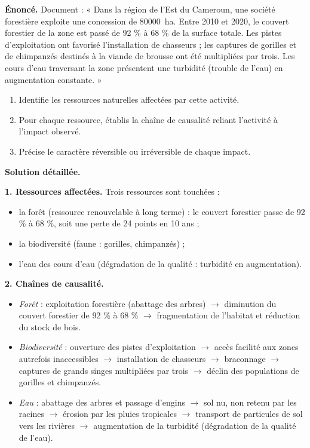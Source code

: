 \documentclass[11pt]{article}
\newcommand{\cle}[1]{{\popxbold\color{popdark}#1}}
\begin{document}
\begin{exoresolu}
\textbf{Énoncé.} Document : « Dans la région de l'Est du Cameroun, une société forestière exploite une concession de \SI{80000}{ha}. Entre 2010 et 2020, le couvert forestier de la zone est passé de 92 \% à 68 \% de la surface totale. Les pistes d'exploitation ont favorisé l'installation de chasseurs ; les captures de gorilles et de chimpanzés destinés à la viande de brousse ont été multipliées par trois. Les cours d'eau traversant la zone présentent une turbidité (trouble de l'eau) en augmentation constante. »
\begin{enumerate}
\item Identifie les ressources naturelles affectées par cette activité.
\item Pour chaque ressource, établis la chaîne de causalité reliant l'activité à l'impact observé.
\item Précise le caractère réversible ou irréversible de chaque impact.
\end{enumerate}
\tcblower
\textbf{Solution détaillée.}

\textbf{1. Ressources affectées.} Trois ressources sont touchées :
\begin{itemize}
\item la \cle{forêt} (ressource renouvelable à long terme) : le couvert forestier passe de 92 \% à 68 \%, soit une perte de 24 points en 10 ans ;
\item la \cle{biodiversité} (faune : gorilles, chimpanzés) ;
\item l'\cle{eau} des cours d'eau (dégradation de la qualité : turbidité en augmentation).
\end{itemize}

\textbf{2. Chaînes de causalité.}
\begin{itemize}
\item \emph{Forêt} : exploitation forestière (abattage des arbres) $\rightarrow$ diminution du couvert forestier de 92 \% à 68 \% $\rightarrow$ fragmentation de l'habitat et réduction du stock de bois.
\item \emph{Biodiversité} : ouverture des pistes d'exploitation $\rightarrow$ accès facilité aux zones autrefois inaccessibles $\rightarrow$ installation de chasseurs $\rightarrow$ braconnage $\rightarrow$ captures de grands singes multipliées par trois $\rightarrow$ déclin des populations de gorilles et chimpanzés.
\item \emph{Eau} : abattage des arbres et passage d'engins $\rightarrow$ sol nu, non retenu par les racines $\rightarrow$ érosion par les pluies tropicales $\rightarrow$ transport de particules de sol vers les rivières $\rightarrow$ augmentation de la turbidité (dégradation de la qualité de l'eau).
\end{itemize}


\end{exoresolu}
\end{document}
